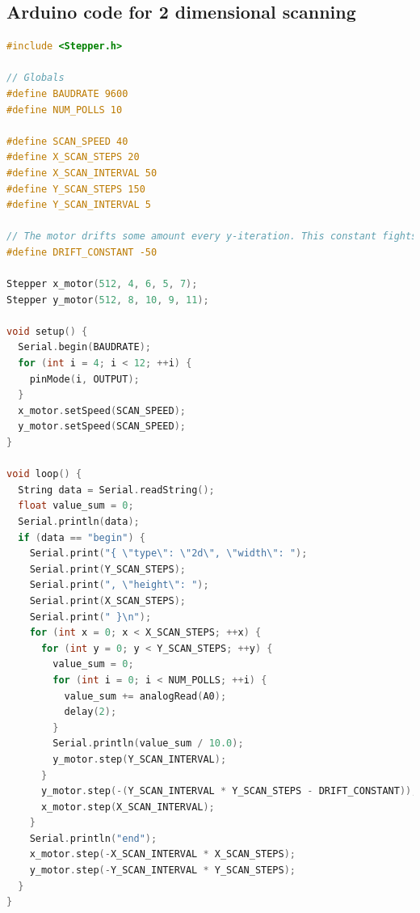 \documentclass[letterpaper, 12pt]{article}
\begin{document}
\subsection{Arduino code for 2 dimensional scanning}
\begin{lstlisting}[language=C]
#include <Stepper.h>

// Globals
#define BAUDRATE 9600
#define NUM_POLLS 10

#define SCAN_SPEED 40
#define X_SCAN_STEPS 20
#define X_SCAN_INTERVAL 50
#define Y_SCAN_STEPS 150
#define Y_SCAN_INTERVAL 5

// The motor drifts some amount every y-iteration. This constant fights against that.
#define DRIFT_CONSTANT -50

Stepper x_motor(512, 4, 6, 5, 7);
Stepper y_motor(512, 8, 10, 9, 11);

void setup() {
  Serial.begin(BAUDRATE);
  for (int i = 4; i < 12; ++i) {
    pinMode(i, OUTPUT);
  }
  x_motor.setSpeed(SCAN_SPEED);
  y_motor.setSpeed(SCAN_SPEED);
}

void loop() {
  String data = Serial.readString();
  float value_sum = 0;
  Serial.println(data);
  if (data == "begin") {
    Serial.print("{ \"type\": \"2d\", \"width\": ");
    Serial.print(Y_SCAN_STEPS);
    Serial.print(", \"height\": ");
    Serial.print(X_SCAN_STEPS);
    Serial.print(" }\n");
    for (int x = 0; x < X_SCAN_STEPS; ++x) {
      for (int y = 0; y < Y_SCAN_STEPS; ++y) {
        value_sum = 0;
        for (int i = 0; i < NUM_POLLS; ++i) {
          value_sum += analogRead(A0);
          delay(2);
        }
        Serial.println(value_sum / 10.0);
        y_motor.step(Y_SCAN_INTERVAL);
      }
      y_motor.step(-(Y_SCAN_INTERVAL * Y_SCAN_STEPS - DRIFT_CONSTANT));
      x_motor.step(X_SCAN_INTERVAL);
    }
    Serial.println("end");
    x_motor.step(-X_SCAN_INTERVAL * X_SCAN_STEPS);
    y_motor.step(-Y_SCAN_INTERVAL * Y_SCAN_STEPS);
  }
}
\end{lstlisting}
\end{document}
